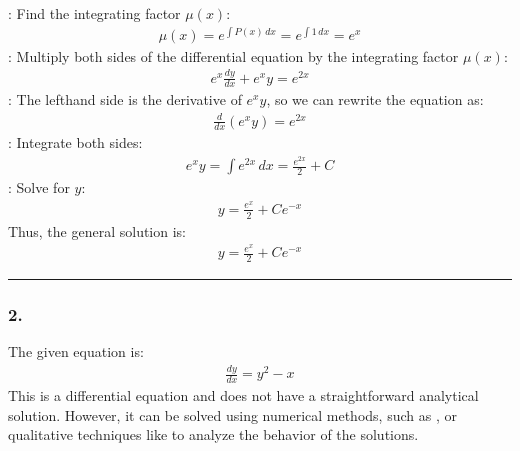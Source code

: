 \documentclass[letterpaper,10pt,english]{jupyterBook}
\begin{document}
\sphinxAtStartPar
{}: Find the integrating factor \(\mu(x)\):
\begin{equation*}
\begin{split}
\mu(x) = e^{\int P(x) \, dx} = e^{\int 1 \, dx} = e^x
\end{split}
\end{equation*}
\sphinxAtStartPar
{}: Multiply both sides of the differential equation by the integrating factor \(\mu(x)\):
\begin{equation*}
\begin{split}
e^x \frac{dy}{dx} + e^x y = e^{2x}
\end{split}
\end{equation*}
\sphinxAtStartPar
{}: The left\sphinxhyphen{}hand side is the derivative of \(e^x y\), so we can rewrite the equation as:
\begin{equation*}
\begin{split}
\frac{d}{dx} \left( e^x y \right) = e^{2x}
\end{split}
\end{equation*}
\sphinxAtStartPar
{}: Integrate both sides:
\begin{equation*}
\begin{split}
e^x y = \int e^{2x} \, dx = \frac{e^{2x}}{2} + C
\end{split}
\end{equation*}
\sphinxAtStartPar
{}: Solve for \(y\):
\begin{equation*}
\begin{split}
y = \frac{e^x}{2} + Ce^{-x}
\end{split}
\end{equation*}
\sphinxAtStartPar
Thus, the general solution is:
\begin{equation*}
\begin{split}
y = \frac{e^x}{2} + Ce^{-x}
\end{split}
\end{equation*}

\bigskip\hrule\bigskip



\subsubsection{2. }
\label{\detokenize{prerequisites:non-linear-differential-equation}}
\sphinxAtStartPar
The given equation is:
\begin{equation*}
\begin{split}
\frac{dy}{dx} = y^2 - x
\end{split}
\end{equation*}
\sphinxAtStartPar
This is a  differential equation and does not have a straightforward analytical solution. However, it can be solved using numerical methods, such as , or qualitative techniques like  to analyze the behavior of the solutions.
\end{document}
